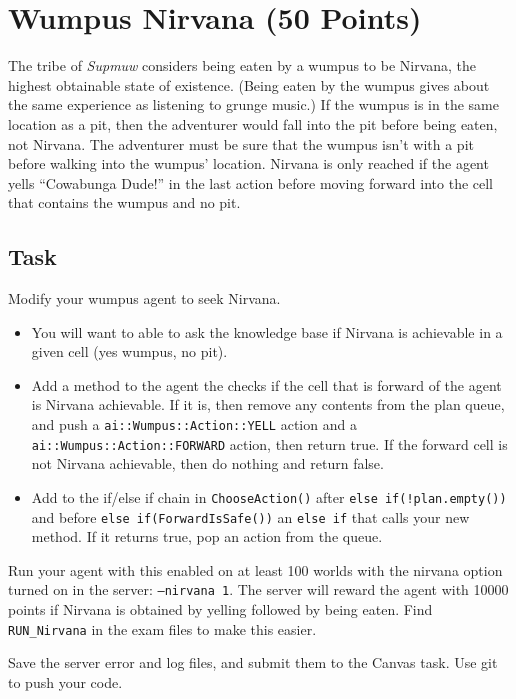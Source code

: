 \section*{Wumpus Nirvana (50 Points)}


The tribe of \emph{Supmuw} considers being eaten by a wumpus to be Nirvana,
the highest obtainable state of existence.  (Being eaten by the wumpus gives
about the same experience as listening to grunge music.)
If the wumpus is in the same location as a pit, then the adventurer would
fall into the pit before being eaten, not Nirvana.
The adventurer must be sure that the wumpus isn't with a pit before walking
into the wumpus' location.  Nirvana is only reached if the agent
yells ``Cowabunga Dude!'' in the last action before moving forward into the
cell that contains the wumpus and no pit.

\subsection*{Task}

Modify your wumpus agent to seek Nirvana.

\begin{itemize}
\item You will want to able to ask the knowledge base if Nirvana is 
  achievable in a given cell
  (yes wumpus, no pit).
\item Add a method to the agent the checks if the cell that
  is forward of the agent is Nirvana achievable.  If it is,
  then remove any contents from the plan queue, and push
  a \texttt{ai::Wumpus::Action::YELL} action and a \texttt{ai::Wumpus::Action::FORWARD}
  action, then return true.
  If the forward cell is not Nirvana achievable, then
  do nothing and return false.
\item Add to the if/else if chain in \texttt{ChooseAction()}
  after \texttt{else if(!plan.empty())} and before \texttt{else if(ForwardIsSafe())}
  an \texttt{else if} that calls your new method.  If it returns true,
  pop an action from the queue.
  \end{itemize}

Run your agent with this enabled on at least 100 worlds with the nirvana option
turned on in the server: \texttt{--nirvana 1}.  The server will reward the
agent with 10000 points if Nirvana is obtained by yelling followed by being
eaten.  Find \texttt{RUN\_Nirvana} in the exam files to make this easier.

Save the server error and log files, and submit them to the Canvas task.
Use git to push your code.
